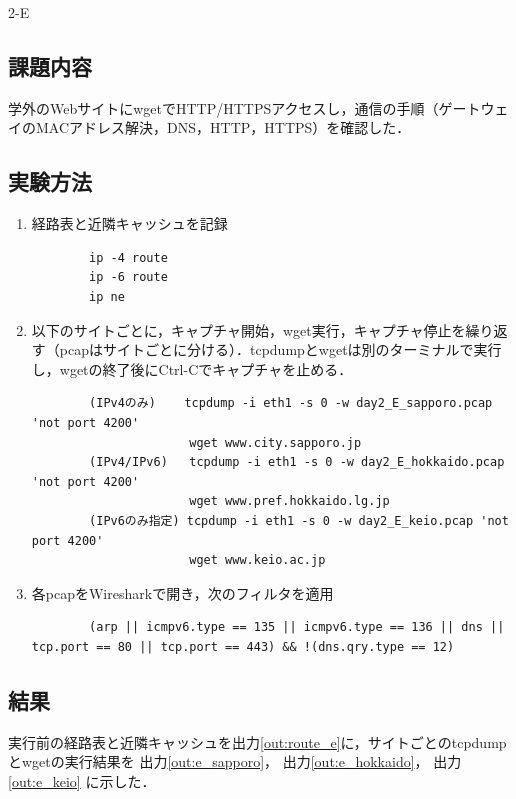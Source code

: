 \begin{maintask}{2-E}
  \subsection*{課題内容}
  学外のWebサイトにwgetでHTTP/HTTPSアクセスし，通信の手順（ゲートウェイのMACアドレス解決，DNS，HTTP，HTTPS）を確認した．

  \subsection*{実験方法}
  \begin{enumerate}
    \item 経路表と近隣キャッシュを記録
      \begin{verbatim}
        ip -4 route
        ip -6 route
        ip ne
      \end{verbatim}

    \item 以下のサイトごとに，キャプチャ開始，wget実行，キャプチャ停止を繰り返す（pcapはサイトごとに分ける）．tcpdumpとwgetは別のターミナルで実行し，wgetの終了後にCtrl-Cでキャプチャを止める．
      \begin{verbatim}
        (IPv4のみ)    tcpdump -i eth1 -s 0 -w day2_E_sapporo.pcap 'not port 4200'
                      wget www.city.sapporo.jp
        (IPv4/IPv6)   tcpdump -i eth1 -s 0 -w day2_E_hokkaido.pcap 'not port 4200'
                      wget www.pref.hokkaido.lg.jp
        (IPv6のみ指定) tcpdump -i eth1 -s 0 -w day2_E_keio.pcap 'not port 4200'
                      wget www.keio.ac.jp
      \end{verbatim}

    \item 各pcapをWiresharkで開き，次のフィルタを適用
      \begin{verbatim}
        (arp || icmpv6.type == 135 || icmpv6.type == 136 || dns || tcp.port == 80 || tcp.port == 443) && !(dns.qry.type == 12)
      \end{verbatim}
  \end{enumerate}

  \subsection*{結果}
  実行前の経路表と近隣キャッシュを出力\ref{out:route_e}に，サイトごとのtcpdumpとwgetの実行結果を
  出力\ref{out:e_sapporo}，
  出力\ref{out:e_hokkaido}，
  出力\ref{out:e_keio}
  に示した．


\end{maintask}
